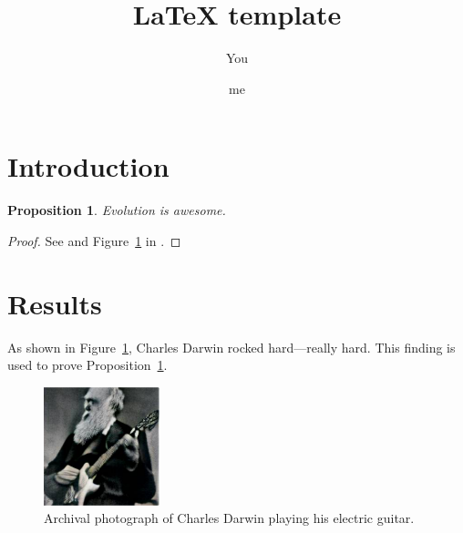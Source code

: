 \documentclass{article}
\title{\LaTeX{} template}
\author{You \and me}
\newtheorem{prop}{Proposition}
\begin{document}
\maketitle

\section*{Introduction}\label{sec:intro}

\begin{prop}\label{prop:evo}
Evolution is awesome.
\end{prop}
\begin{proof}
  See \cite{darwin1909origin} and Figure~\ref{fig:darwin} in .
\end{proof}

\section*{Results}\label{sec:results}

As shown in Figure~\ref{fig:darwin}, Charles Darwin rocked hard---really hard.
This finding is used to prove Proposition~\ref{prop:evo}.

\begin{figure}[h]
 \centering
 \includegraphics[width=0.3\textwidth]{darwin-rock}
 \caption{Archival photograph of Charles Darwin playing his electric guitar.}
 \label{fig:darwin}
\end{figure}




\end{document}
